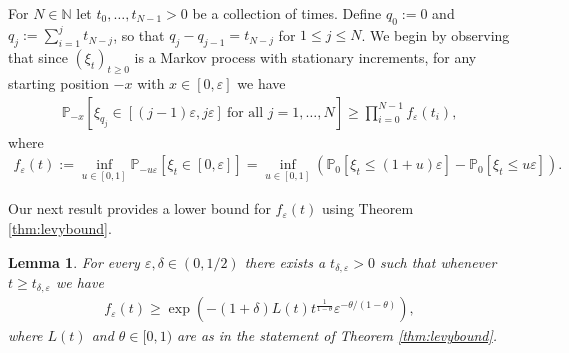 \documentclass[a4,12pt]{amsart}
\numberwithin{equation}{section}
\newtheorem{lemma}[thm]{Lemma}
\begin{document}
	For $N \in \mathbb{N}$ let $t_0,\ldots,t_{N-1} > 0$ be a collection of times. 
	Define $q_0 := 0$ and $q_j := \sum_{i=1}^j t_{N-j}$, so that $q_j - q_{j-1} = t_{N-j}$ 
	for $1 \leq j \leq N$. We begin by observing that since $(\xi_t)_{t \geq 0}$ is a 
	Markov process with stationary increments, for any starting position $-x$ with $x \in [0,\varepsilon]$ we have
	\begin{align} \label{eq:Markov}
		\mathbb{P}_{-x} \left[ \xi_{q_j } \in [(j-1)\varepsilon, j \varepsilon ] ~ 
		\text{for all $j = 1,\ldots,N$} \right] \geq \prod_{ i = 0}^{N-1} f_\varepsilon(t_i),
	\end{align}
	where
	\begin{align*}
		f_\varepsilon(t) := 
		\inf_{ u \in [0,1] } \mathbb{P}_{-u\varepsilon} [ \xi_t \in [0,\varepsilon] ] = 
		\inf_{u \in [0,1]} \left( \mathbb{P}_0[ \xi_t \leq (1+u)\varepsilon ] - 
		\mathbb{P}_0 [ \xi_t \leq u\varepsilon] \right).
	\end{align*}

	Our next result provides a lower bound for $f_\varepsilon(t)$ using Theorem \ref{thm:levybound}.

	\begin{lemma} \label{lem:pushlower}
		For every $\varepsilon, \delta \in (0,1/2)$ there exists a 
		$t_{\delta,\varepsilon} >0 $ such that whenever $t \geq t_{\delta,\varepsilon}$ we have 
		\begin{align*}
			f_\varepsilon(t) \geq 
			\exp \left( - (1 + \delta) L(t) t^{\frac{1}{1-\theta}} \varepsilon^{-\theta/(1-\theta)} \right),
		\end{align*}
        where $L(t)$ and $\theta \in [0,1)$ are as in the statement of Theorem \ref{thm:levybound}.
	\end{lemma}
\end{document}
